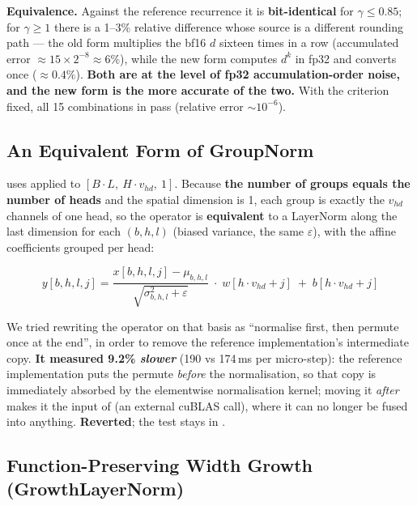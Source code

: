 \documentclass[11pt,openany]{article}
\begin{document}
\textbf{Equivalence.} Against the reference recurrence it is \textbf{bit-identical} for
$\gamma \le 0.85$; for $\gamma \ge 1$ there is a 1--3\% relative difference whose source
is a different rounding path --- the old form multiplies the bf16 $d$ sixteen times in a
row (accumulated error $\approx 15 \times 2^{-8} \approx 6\%$), while the new form computes
$d^k$ in fp32 and converts once ($\approx 0.4\%$). \textbf{Both are at the level of fp32
accumulation-order noise, and the new form is the more accurate of the two.} With the
criterion fixed, all 15 combinations in  pass
(relative error $\sim 10^{-6}$).

\subsection{An Equivalent Form of GroupNorm}
\label{sec:en-arch-gn}

 uses 
applied to $[B{\cdot}L,\ H{\cdot}v_{hd},\ 1]$. Because \textbf{the number of groups equals
the number of heads} and the spatial dimension is 1, each group is exactly the $v_{hd}$
channels of one head, so the operator is \textbf{equivalent} to a LayerNorm along the last
dimension for each $(b,h,l)$ (biased variance, the same $\varepsilon$), with the affine
coefficients grouped per head:

\[
y[b,h,l,j] = \frac{x[b,h,l,j]-\mu_{b,h,l}}{\sqrt{\sigma^2_{b,h,l}+\varepsilon}}
\;\cdot\; w[h{\cdot}v_{hd}+j] \;+\; b[h{\cdot}v_{hd}+j]
\]

We tried rewriting the operator on that basis as ``normalise first, then permute once at
the end'', in order to remove the reference implementation's intermediate copy.
\textbf{It measured 9.2\% \emph{slower}} (190 vs 174\,ms per micro-step): the reference
implementation puts the permute \emph{before} the normalisation, so that copy is
immediately absorbed by the elementwise normalisation kernel; moving it \emph{after}
makes it the input of  (an external cuBLAS call), where it can no longer
be fused into anything. \textbf{Reverted}; the test stays in
.

\subsection{Function-Preserving Width Growth (GrowthLayerNorm)}
\label{sec:en-arch-growth}
\end{document}

